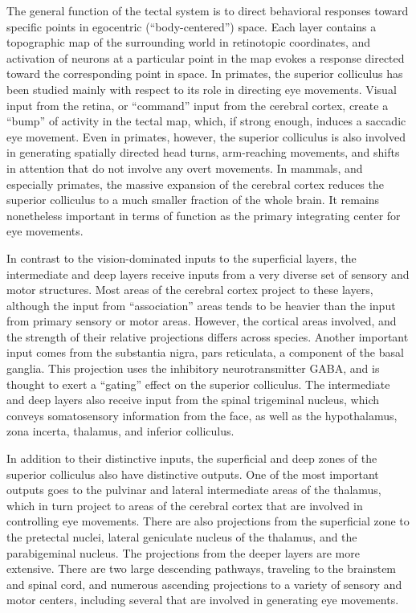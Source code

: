 \documentclass[]{book}
\begin{document}
The general function of the tectal system is to direct behavioral responses toward specific points in egocentric (``body-centered'') space. Each layer contains a topographic map of the surrounding world in retinotopic coordinates, and activation of neurons at a particular point in the map evokes a response directed toward the corresponding point in space. In primates, the superior colliculus has been studied mainly with respect to its role in directing eye movements. Visual input from the retina, or ``command'' input from the cerebral cortex, create a ``bump'' of activity in the tectal map, which, if strong enough, induces a saccadic eye movement. Even in primates, however, the superior colliculus is also involved in generating spatially directed head turns, arm-reaching movements, and shifts in attention that do not involve any overt movements. In mammals, and especially primates, the massive expansion of the cerebral cortex reduces the superior colliculus to a much smaller fraction of the whole brain. It remains nonetheless important in terms of function as the primary integrating center for eye movements.

In contrast to the vision-dominated inputs to the superficial layers, the intermediate and deep layers receive inputs from a very diverse set of sensory and motor structures. Most areas of the cerebral cortex project to these layers, although the input from ``association'' areas tends to be heavier than the input from primary sensory or motor areas. However, the cortical areas involved, and the strength of their relative projections differs across species. Another important input comes from the substantia nigra, pars reticulata, a component of the basal ganglia. This projection uses the inhibitory neurotransmitter GABA, and is thought to exert a ``gating'' effect on the superior colliculus. The intermediate and deep layers also receive input from the spinal trigeminal nucleus, which conveys somatosensory information from the face, as well as the hypothalamus, zona incerta, thalamus, and inferior colliculus.

In addition to their distinctive inputs, the superficial and deep zones of the superior colliculus also have distinctive outputs. One of the most important outputs goes to the pulvinar and lateral intermediate areas of the thalamus, which in turn project to areas of the cerebral cortex that are involved in controlling eye movements. There are also projections from the superficial zone to the pretectal nuclei, lateral geniculate nucleus of the thalamus, and the parabigeminal nucleus. The projections from the deeper layers are more extensive. There are two large descending pathways, traveling to the brainstem and spinal cord, and numerous ascending projections to a variety of sensory and motor centers, including several that are involved in generating eye movements.
\end{document}
